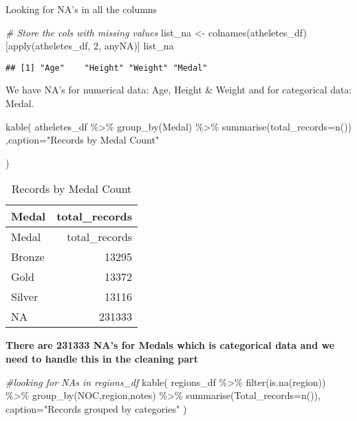 \documentclass[
]{article}
\newenvironment{Shaded}{\begin{snugshade}}{\end{snugshade}}
\newcommand{\AttributeTok}[1]{\textcolor[rgb]{0.77,0.63,0.00}{#1}}
\newcommand{\CommentTok}[1]{\textcolor[rgb]{0.56,0.35,0.01}{\textit{#1}}}
\newcommand{\DecValTok}[1]{\textcolor[rgb]{0.00,0.00,0.81}{#1}}
\newcommand{\FunctionTok}[1]{\textcolor[rgb]{0.00,0.00,0.00}{#1}}
\newcommand{\NormalTok}[1]{#1}
\newcommand{\OtherTok}[1]{\textcolor[rgb]{0.56,0.35,0.01}{#1}}
\newcommand{\SpecialCharTok}[1]{\textcolor[rgb]{0.00,0.00,0.00}{#1}}
\newcommand{\StringTok}[1]{\textcolor[rgb]{0.31,0.60,0.02}{#1}}
\begin{document}
Looking for NA's in all the columns

\begin{Shaded}
\begin{Highlighting}[]
\CommentTok{\# Store the cols with missing values }
\NormalTok{list\_na }\OtherTok{\textless{}{-}} \FunctionTok{colnames}\NormalTok{(atheletes\_df)[}\FunctionTok{apply}\NormalTok{(atheletes\_df, }\DecValTok{2}\NormalTok{, anyNA)]}
\NormalTok{list\_na}
\end{Highlighting}
\end{Shaded}

\begin{verbatim}
## [1] "Age"    "Height" "Weight" "Medal"
\end{verbatim}

We have NA's for numerical data: Age, Height \& Weight and for
categorical data: Medal.

\begin{Shaded}
\begin{Highlighting}[]
\FunctionTok{kable}\NormalTok{(}
\NormalTok{  atheletes\_df }\SpecialCharTok{\%\textgreater{}\%}
    \FunctionTok{group\_by}\NormalTok{(Medal) }\SpecialCharTok{\%\textgreater{}\%}
    \FunctionTok{summarise}\NormalTok{(}\AttributeTok{total\_records=}\FunctionTok{n}\NormalTok{())}
\NormalTok{    ,}\AttributeTok{caption=}\StringTok{"Records by Medal Count"}
  
\NormalTok{)}
\end{Highlighting}
\end{Shaded}

\begin{longtable}[]{@{}lr@{}}
\caption{Records by Medal Count}\tabularnewline
\toprule
Medal & total\_records \\
\midrule
\endfirsthead
\toprule
Medal & total\_records \\
\midrule
\endhead
Bronze & 13295 \\
Gold & 13372 \\
Silver & 13116 \\
NA & 231333 \\
\bottomrule
\end{longtable}

\textbf{There are 231333 NA's for Medals which is categorical data and
we need to handle this in the cleaning part}

\begin{Shaded}
\begin{Highlighting}[]
\CommentTok{\#looking for NA\textquotesingle{}s in regions\_df}
\FunctionTok{kable}\NormalTok{(}
\NormalTok{  regions\_df }\SpecialCharTok{\%\textgreater{}\%}
    \FunctionTok{filter}\NormalTok{(}\FunctionTok{is.na}\NormalTok{(region)) }\SpecialCharTok{\%\textgreater{}\%}
    \FunctionTok{group\_by}\NormalTok{(NOC,region,notes) }\SpecialCharTok{\%\textgreater{}\%}
  \FunctionTok{summarise}\NormalTok{(}\AttributeTok{Total\_records=}\FunctionTok{n}\NormalTok{()),}
  \AttributeTok{caption=}\StringTok{"Records grouped by categories"}
\NormalTok{)}
\end{Highlighting}
\end{Shaded}
\end{document}
